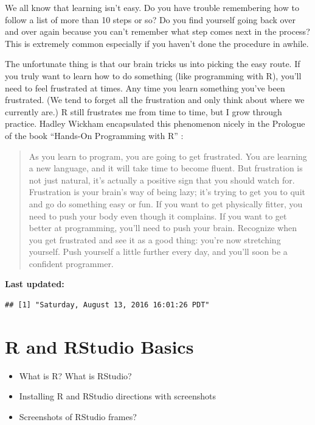 \documentclass[]{tufte-book}
\providecommand{\tightlist}{%
  \setlength{\itemsep}{0pt}\setlength{\parskip}{0pt}}
\begin{document}
\begin{enumerate}
  We all know that learning isn't easy. Do you have trouble remembering
  how to follow a list of more than 10 steps or so? Do you find yourself
  going back over and over again because you can't remember what step
  comes next in the process? This is extremely common especially if you
  haven't done the procedure in awhile.

  The unfortunate thing is that our brain tricks us into picking the
  easy route. If you truly want to learn how to do something (like
  programming with R), you'll need to feel frustrated at times. Any time
  you learn something you've been frustrated. (We tend to forget all the
  frustration and only think about where we currently are.) R still
  frustrates me from time to time, but I grow through practice. Hadley
  Wickham encapsulated this phenomenon nicely in the Prologue of the
  book ``Hands-On Programming with R'' \citep{handson2014}:

  \begin{quote}
  As you learn to program, you are going to get frustrated. You are
  learning a new language, and it will take time to become fluent. But
  frustration is not just natural, it's actually a positive sign that
  you should watch for. Frustration is your brain's way of being lazy;
  it's trying to get you to quit and go do something easy or fun. If you
  want to get physically fitter, you need to push your body even though
  it complains. If you want to get better at programming, you'll need to
  push your brain. Recognize when you get frustrated and see it as a
  good thing: you're now stretching yourself. Push yourself a little
  further every day, and you'll soon be a confident programmer.
  \end{quote}
\end{enumerate}

\textbf{Last updated:}

\begin{verbatim}
## [1] "Saturday, August 13, 2016 16:01:26 PDT"
\end{verbatim}

\chapter{R and RStudio Basics}\label{rstudiobasics}

\begin{itemize}
\tightlist
\item
  What is R? What is RStudio?
\item
  Installing R and RStudio directions with screenshots
\item
  Screenshots of RStudio frames?
\end{itemize}
\end{document}
